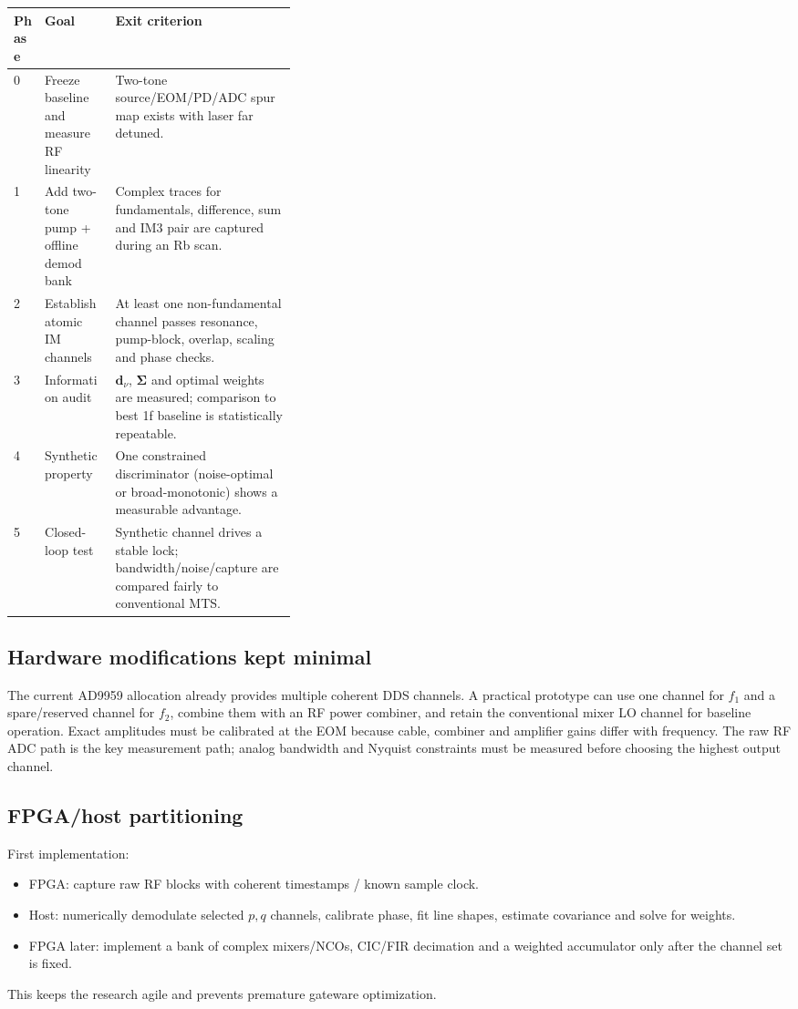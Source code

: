 \documentclass[10pt]{article}
\newcommand{\vect}[1]{\bm{#1}}
\begin{document}
\begin{tabularx}{\linewidth}{p{0.11\linewidth}p{0.25\linewidth}X}
\toprule
\textbf{Phase} & \textbf{Goal} & \textbf{Exit criterion}\\
\midrule
0 & Freeze baseline and measure RF linearity & Two-tone source/EOM/PD/ADC spur map exists with laser far detuned.\\
1 & Add two-tone pump + offline demod bank & Complex traces for fundamentals, difference, sum and IM3 pair are captured during an Rb scan.\\
2 & Establish atomic IM channels & At least one non-fundamental channel passes resonance, pump-block, overlap, scaling and phase checks.\\
3 & Information audit & $\vect d_\nu$, $\vect\Sigma$ and optimal weights are measured; comparison to best 1f baseline is statistically repeatable.\\
4 & Synthetic property & One constrained discriminator (noise-optimal or broad-monotonic) shows a measurable advantage.\\
5 & Closed-loop test & Synthetic channel drives a stable lock; bandwidth/noise/capture are compared fairly to conventional MTS.\\
\bottomrule
\end{tabularx}

\subsection{Hardware modifications kept minimal}
The current AD9959 allocation already provides multiple coherent DDS channels. A practical prototype can use one channel for $f_1$ and a spare/reserved channel for $f_2$, combine them with an RF power combiner, and retain the conventional mixer LO channel for baseline operation. Exact amplitudes must be calibrated at the EOM because cable, combiner and amplifier gains differ with frequency. The raw RF ADC path is the key measurement path; analog bandwidth and Nyquist constraints must be measured before choosing the highest output channel.

\subsection{FPGA/host partitioning}
First implementation:
\begin{itemize}
\item FPGA: capture raw RF blocks with coherent timestamps / known sample clock.
\item Host: numerically demodulate selected $p,q$ channels, calibrate phase, fit line shapes, estimate covariance and solve for weights.
\item FPGA later: implement a bank of complex mixers/NCOs, CIC/FIR decimation and a weighted accumulator only after the channel set is fixed.
\end{itemize}
This keeps the research agile and prevents premature gateware optimization.
\end{document}
